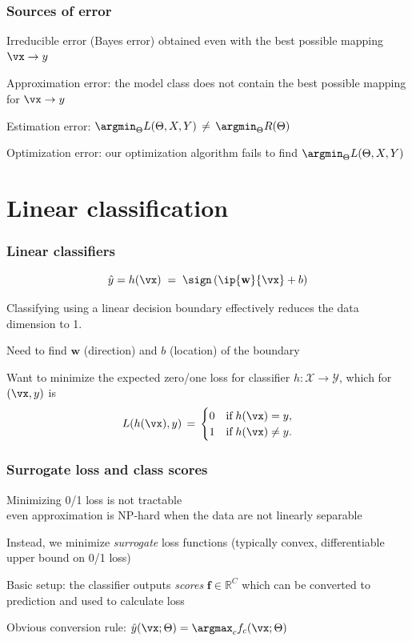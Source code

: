 \documentclass[xcolor=dvipsnames]{beamer}
\begin{document}
\begin{frame}
  \frametitle{Sources of error}
  \bi
\item Irreducible error (Bayes error) obtained even with the best
  possible mapping $\vx\to y$
\item Approximation error: the model class does not contain the best
  possible mapping for $\vx\to y$
\item Estimation error: $\argmin_\Theta
  L(\Theta,X,Y)\,\ne\,\argmin_\Theta R(\Theta)$
\item Optimization error: our optimization algorithm fails to find $\argmin_\Theta
  L(\Theta,X,Y)$
\ei
\end{frame}


\section{Linear classification}

\begin{frame}\frametitle{Linear classifiers}
\[
\hat{y}=h(\vx)\;=\;\sign\left(\ip{\mathbf{w}}{\vx}+b\right)
\]
\bi
\item Classifying using a linear decision boundary effectively reduces the data dimension to 1.
\item Need to find $\mathbf{w}$ (direction) and $b$
(location) of the boundary
\item Want to minimize the expected zero/one loss for classifier
  $h:\mathcal{X}\to\mathcal{Y}$, which for $(\vx,y)$ is
\[L(h(\vx),y)\,=\,\begin{cases}0 & \text{if}\;h(\vx)=y,\\ 1
  &\text{if}\;h(\vx)\ne y.
\end{cases}
\]
\ei

\end{frame}  

\begin{frame}
  \frametitle{Surrogate loss and class scores}
  \bi
\item Minimizing 0/1 loss is not tractable\\
even approximation is NP-hard when the data are not linearly separable
\item Instead, we minimize \emph{surrogate} loss functions (typically
  convex, differentiable upper bound on 0/1 loss)
\item Basic setup: the classifier outputs \emph{scores}
  $\mathbf{f}\in\mathbb{R}^C$ which can be converted to prediction and
  used to calculate loss
\item Obvious conversion rule: $\hat{y}(\vx;\Theta)=\argmax_cf_c(\vx;\Theta)$

\ei
\end{frame}
\end{document}
